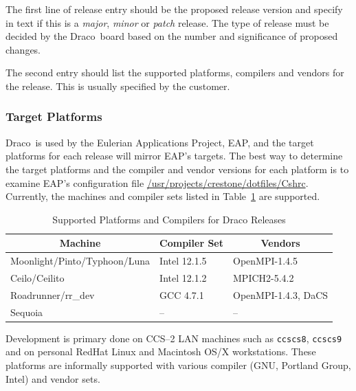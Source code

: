\documentclass[note]{ResearchNote_pdf}
\newcommand{\draco}{{\normalfont\small\sffamily Draco}}
\begin{document}
The first line of release entry should be the proposed release version
and specify in text if this is a {\it major}, {\it minor} or {\it
  patch} release.  The type of release must be decided by the
\draco\ board based on the number and significance of proposed
changes.

The second entry should list the supported platforms, compilers and
vendors for the release.  This is usually specified by the customer.


\subsubsection{Target Platforms}
\label{sec:target_platforms}

\draco\ is used by the Eulerian Applications Project, EAP, and the
target platforms for each release will mirror EAP's targets.  The best
way to determine the target platforms and the compiler and vendor
versions for each platform is to examine EAP's configuration file
\url{/usr/projects/crestone/dotfiles/Cshrc}.  Currently, the machines
and compiler sets listed in Table~\ref{tab:supported_platforms} are
supported.
%
\begin{table}[ht]
  \caption{Supported Platforms and Compilers for Draco Releases}
  \label{tab:supported_platforms}
\begin{center}
\begin{tabular}{lll} \hline\hline
\multicolumn{1}{c}{Machine} & 
\multicolumn{1}{c}{Compiler Set} & 
\multicolumn{1}{c}{Vendors} \\ \hline
Moonlight/Pinto/Typhoon/Luna & Intel 12.1.5 &  OpenMPI-1.4.5 \\
Ceilo/Ceilito         & Intel 12.1.2     &  MPICH2-5.4.2 \\
Roadrunner/rr\_dev    & GCC 4.7.1      &  OpenMPI-1.4.3, DaCS \\
Sequoia                  & --             &  --             \\
\hline\hline
\end{tabular}
\end{center}
\end{table}

Development is primary done on CCS--2 LAN machines such as
\texttt{ccscs8}, \texttt{ccscs9} and on personal RedHat Linux and
Macintosh OS/X workstations.  These platforms are informally supported
with various compiler (GNU, Portland Group, Intel) and vendor sets.  
\end{document}
